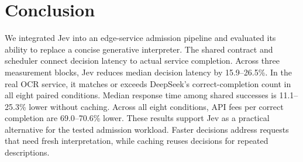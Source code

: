 \section{Conclusion}
We integrated Jev into an edge-service admission pipeline and evaluated its
ability to replace a concise generative interpreter. The shared contract
and scheduler connect decision latency to actual service completion. Across
three measurement blocks, Jev reduces median decision latency by
15.9--26.5\%. In the real OCR service, it matches or exceeds DeepSeek's
correct-completion count in all eight paired conditions. Median response
time among shared successes is 11.1--25.3\% lower without caching. Across
all eight conditions, API fees per correct completion are 69.0--70.6\% lower.
These results support Jev as a practical alternative for the tested
admission workload. Faster decisions address requests that need fresh
interpretation, while caching reuses decisions for repeated descriptions.
